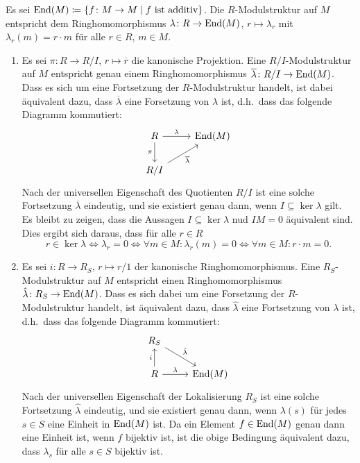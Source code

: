 \begin{solution}
  Es sei $\operatorname{End}(M) \coloneqq \{f \colon M \to M \mid \text{$f$ ist additiv}\}$.
  Die $R$-Modulstruktur auf $M$ entspricht dem Ringhomomorphismus $\lambda \colon R \to \operatorname{End}(M)$, $r \mapsto \lambda_r$ mit $\lambda_r(m) = r \cdot m$ für alle $r \in R$, $m \in M$.
  \begin{enumerate}
    \item
      Es sei $\pi \colon R \to R/I$, $r \mapsto \overline{r}$ die kanonische Projektion.
      Eine $R/I$-Modulstruktur auf $M$ entspricht genau einem Ringhomomorphismus $\overline{\lambda} \colon R/I \to \operatorname{End}(M)$.
      Dass es sich um eine Fortsetzung der $R$-Modulstruktur handelt, ist dabei äquivalent dazu, dass $\overline{\lambda}$ eine Forsetzung von $\lambda$ ist, d.h.\ dass das folgende Diagramm kommutiert:
      \[
        \begin{tikzcd}[ampersand replacement = \&]
              R
              \arrow{r}{\lambda}
              \arrow[swap]{d}{\pi}
          \&  \End(M)
          \\
              R/I
              \arrow[swap]{ru}{\overline{\lambda}}
          \&  {}
        \end{tikzcd}
      \]
      Nach der universellen Eigenschaft des Quotienten $R/I$ ist eine solche Fortsetzung $\overline{\lambda}$ eindeutig, und sie existiert genau dann, wenn $I \subseteq \ker \lambda$ gilt.
      Es bleibt zu zeigen, dass die Aussagen $I \subseteq \ker \lambda$ nud $IM = 0$ äquivalent sind.
      Dies ergibt sich daraus, dass für alle $r \in R$
      \[
              r \in \ker \lambda
        \iff  \lambda_r = 0
        \iff  \forall m \in M : \lambda_r(m) = 0
        \iff  \forall m \in M : r \cdot m = 0.
      \]
    \item
      Es sei $i \colon R \to R_S$, $r \mapsto r/1$ der kanonische Ringhomomorphismus.
      Eine $R_S$-Mo\-dul\-struk\-tur auf $M$ entspricht einen Ringhomomorphismus $\hat{\lambda} \colon R_S \to \operatorname{End}(M)$.
      Dass es sich dabei um eine Forsetzung der $R$-Modulstruktur handelt, ist äquivalent dazu, dass $\hat{\lambda}$ eine Fortsetzung von $\lambda$ ist, d.h.\ dass das folgende Diagramm kommutiert:
      \[
        \begin{tikzcd}[ampersand replacement = \&]
              R_S
              \arrow{rd}{\hat{\lambda}}
          \&  {}
          \\
              R
              \arrow{u}{i}
              \arrow{r}{\lambda}
          \&  \End(M)
        \end{tikzcd}
      \]
      Nach der universellen Eigenschaft der Lokalisierung $R_S$ ist eine solche Fortsetzung $\hat{\lambda}$ eindeutig, und sie existiert genau dann, wenn $\lambda(s)$ für jedes $s \in S$ eine Einheit in $\operatorname{End}(M)$ ist.
      Da ein Element $f \in \operatorname{End}(M)$ genau dann eine Einheit ist, wenn $f$ bijektiv ist, ist die obige Bedingung äquivalent dazu, dass $\lambda_s$ für alle $s \in S$ bijektiv ist.
  \end{enumerate}
\end{solution}


